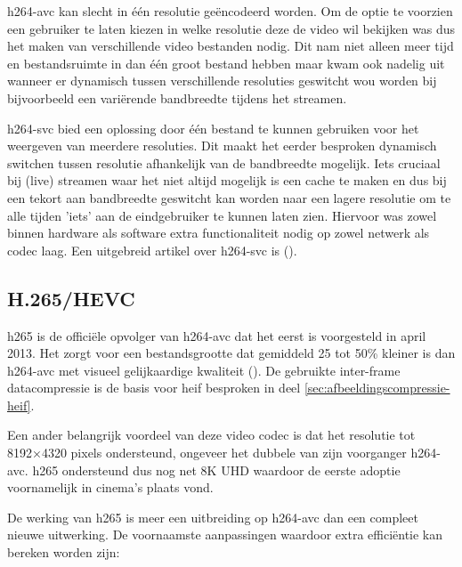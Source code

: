 \Gls{h264-avc} kan slecht in één resolutie geëncodeerd worden. Om de optie te voorzien een gebruiker te laten kiezen in welke resolutie deze de video wil bekijken was dus het maken van verschillende video bestanden nodig. Dit nam niet alleen meer tijd en bestandsruimte in dan één groot bestand hebben maar kwam ook nadelig uit wanneer er dynamisch tussen verschillende resoluties geswitcht wou worden bij bijvoorbeeld een variërende \gls{bandbreedte} tijdens het streamen.

\Gls{h264-svc} bied een oplossing door één bestand te kunnen gebruiken voor het weergeven van meerdere resoluties. Dit maakt het eerder besproken dynamisch switchen tussen resolutie afhankelijk van de \gls{bandbreedte} mogelijk. Iets cruciaal bij (live) streamen waar het niet altijd mogelijk is een cache te maken en dus bij een tekort aan \gls{bandbreedte} geswitcht kan worden naar een lagere resolutie om te alle tijden 'iets' aan de eindgebruiker te kunnen laten zien. Hiervoor was zowel binnen hardware als software extra functionaliteit nodig op zowel netwerk als \gls{codec} laag. Een uitgebreid artikel over \gls{h264-svc} is  (\cite{H264svcoverview}).


\subsection{H.265/HEVC}
\label{sec:videocompressie-h265}

\Gls{h265} is de officiële opvolger van \gls{h264-avc} dat het eerst is voorgesteld in april 2013. Het zorgt voor een bestandsgrootte dat gemiddeld 25 tot 50\% kleiner is dan \gls{h264-avc} met visueel gelijkaardige kwaliteit (\cite{h262h264h265vergelijking}). De gebruikte \gls{inter-frame} \gls{datacompressie} is de basis voor \gls{heif} besproken in deel \ref{sec:afbeeldingscompressie-heif}.

Een ander belangrijk voordeel van deze video \gls{codec} is dat het resolutie tot 8192×4320 \glspl{pixel} ondersteund, ongeveer het dubbele van zijn voorganger \gls{h264-avc}. \Gls{h265} ondersteund dus nog net 8K UHD waardoor de eerste adoptie voornamelijk in cinema's plaats vond.

De werking van \gls{h265} is meer een uitbreiding op \gls{h264-avc} dan een compleet nieuwe uitwerking. De voornaamste aanpassingen waardoor extra efficiëntie kan bereken worden zijn:

